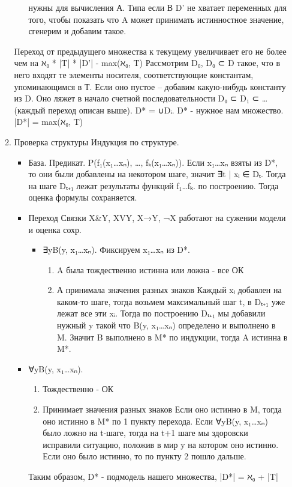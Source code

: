 \documentclass[11pt]{article}
\begin{document}
\begin{itemize}
\begin{enumerate}
\begin{itemize}
нужны для вычисления А. Типа если В D' не хватает переменных для того,
чтобы показать что A может принимать истинностное значение, сгенерим
и добавим такое.
\end{itemize}
Переход от предыдущего множества к текущему увеличивает его не более чем на
ℵ₀ * |T| * |D'| - max(ℵ₀, T)
Рассмотрим D₀, D₀ ⊂ D такое, что в него входят те элементы носителя,
соответствующие константам, упоминающимся в Т. Если оно пустое -- добавим
какую-нибудь константу из D. Оно ляжет в начало счетной последовательности
D₀ ⊂ D₁ ⊂ \ldots{} (каждый переход описан выше). D* = ∪Dᵢ.
D* - нужное нам множество. |D*| = max(ℵ₀, T)
\item Проверка структуры
Индукция по структуре.
\begin{itemize}
\item База. Предикат.
P(f₁(x₁\ldots{}xₙ), \ldots{}, fₖ(x₁\ldots{}xₙ)). Если x₁\ldots{}xₙ взяты из D*, то они были
добавлены на некотором шаге, значит ∃t | xᵢ ∈ Dₜ. Тогда на шаге Dₜ₊₁
лежат результаты функций f₁\ldots{}fₖ. по построению. Тогда оценка формулы
сохраняется.
\item Переход
Связки X\&Y, XVY, X→Y, ¬X работают на сужении модели и оценка сохр.
\begin{itemize}
\item ∃yB(y, x₁\ldots{}xₙ). Фиксируем x₁\ldots{}xₙ из D*.
\begin{enumerate}
\item A была тождественно истинна или ложна - все ОК
\item А принимала значения разных знаков
Каждый xᵢ добавлен на каком-то шаге, тогда возьмем максимальный
шаг t, в Dₜ₊₁ уже лежат все эти xᵢ.
Тогда по построению Dₜ₊₁ мы добавили нужный y такой что B(y, x₁\ldots{}xₙ)
определено и выполнено в M.
Значит B выполнено в M* по индукции, тогда A истинна в M*.
\end{enumerate}
\end{itemize}
\item ∀yB(y, x₁\ldots{}xₙ).
\begin{enumerate}
\item Тождественно - ОК
\item Принимает значения разных знаков
Если оно истинно в M, тогда оно истинно в M* по 1 пункту перехода.
Если ∀yB(y, x₁\ldots{}xₙ) было ложно на t-шаге, тогда на t+1 шаге мы
здоровски исправили ситуацию, положив в мир y на котором оно истинно.
Если оно было истинно, то по пункту 2 пошло дальше.
\end{enumerate}
Таким образом, D* - подмодель нашего множества, |D*| = ℵ₀ + |T|
\end{itemize}
\end{enumerate}
\end{itemize}
\end{document}
